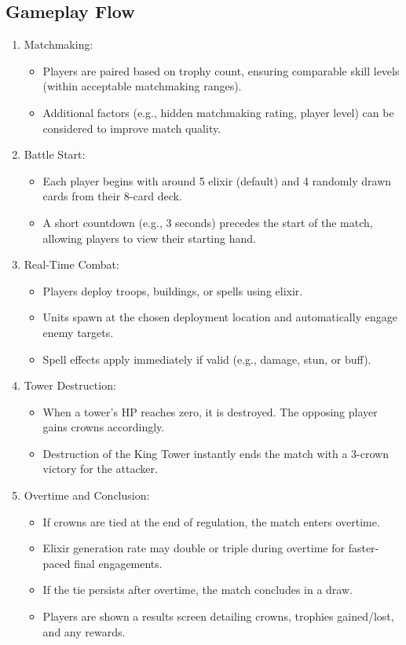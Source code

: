 \documentclass{article}
\begin{document}
\subsection{Gameplay Flow}
\begin{enumerate}[label=\arabic*.]
    \item Matchmaking:
    \begin{itemize}
        \item Players are paired based on trophy count, ensuring comparable skill levels (within acceptable matchmaking ranges).
        \item Additional factors (e.g., hidden matchmaking rating, player level) can be considered to improve match quality.
    \end{itemize}
    \item Battle Start:
    \begin{itemize}
        \item Each player begins with around 5 elixir (default) and 4 randomly drawn cards from their 8-card deck.
        \item A short countdown (e.g., 3 seconds) precedes the start of the match, allowing players to view their starting hand.
    \end{itemize}
    \item Real-Time Combat:
    \begin{itemize}
        \item Players deploy troops, buildings, or spells using elixir.
        \item Units spawn at the chosen deployment location and automatically engage enemy targets.
        \item Spell effects apply immediately if valid (e.g., damage, stun, or buff).
    \end{itemize}
    \item Tower Destruction:
    \begin{itemize}
        \item When a tower's HP reaches zero, it is destroyed. The opposing player gains crowns accordingly.
        \item Destruction of the King Tower instantly ends the match with a 3-crown victory for the attacker.
    \end{itemize}
    \item Overtime and Conclusion:
    \begin{itemize}
        \item If crowns are tied at the end of regulation, the match enters overtime.
        \item Elixir generation rate may double or triple during overtime for faster-paced final engagements.
        \item If the tie persists after overtime, the match concludes in a draw.
        \item Players are shown a results screen detailing crowns, trophies gained/lost, and any rewards.
    \end{itemize}
\end{enumerate}
\end{document}
